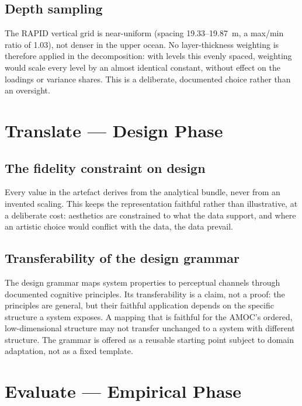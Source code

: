 \subsection*{Depth sampling}
The RAPID vertical grid is near-uniform (spacing 19.33--19.87~m, a max/min ratio of 1.03), not denser in the upper ocean. No layer-thickness weighting is therefore applied in the decomposition: with levels this evenly spaced, weighting would scale every level by an almost identical constant, without effect on the loadings or variance shares. This is a deliberate, documented choice rather than an oversight.

\section{Translate --- Design Phase}
\label{app:limits-translate}

\subsection*{The fidelity constraint on design}
Every value in the artefact derives from the analytical bundle, never from an invented scaling. This keeps the representation faithful rather than illustrative, at a deliberate cost: aesthetics are constrained to what the data support, and where an artistic choice would conflict with the data, the data prevail.

\subsection*{Transferability of the design grammar}
The design grammar maps system properties to perceptual channels through documented cognitive principles. Its transferability is a claim, not a proof: the principles are general, but their faithful application depends on the specific structure a system exposes. A mapping that is faithful for the AMOC's ordered, low-dimensional structure may not transfer unchanged to a system with different structure. The grammar is offered as a reusable starting point subject to domain adaptation, not as a fixed template.

\section{Evaluate --- Empirical Phase}
\label{app:limits-evaluate}

